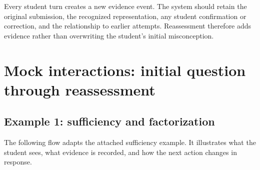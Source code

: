 \documentclass[11pt]{article}
\begin{document}
Every student turn creates a new evidence event. The system should retain the original submission, the recognized representation, any student confirmation or correction, and the relationship to earlier attempts. Reassessment therefore adds evidence rather than overwriting the student's initial misconception.

\section{Mock interactions: initial question through reassessment}

\subsection{Example 1: sufficiency and factorization}

The following flow adapts the attached sufficiency example. It illustrates what the student sees, what evidence is recorded, and how the next action changes in response.
\end{document}
